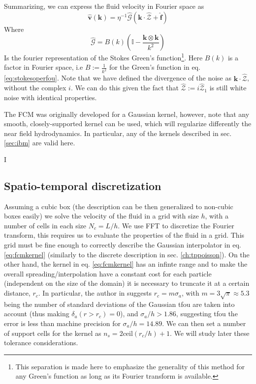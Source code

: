 \documentclass[ twoside,openright,titlepage,numbers=noenddot,%
headinclude,footinclude,cleardoublepage=empty,abstract=on,
BCOR=5mm,paper=a4,fontsize=11pt, dvipsnames
]{scrreprt}
\renewcommand{\vec}[1]{\bm{#1}}
\newcommand{\tens}[1]{\bm{\mathcal{#1}}}
\newcommand{\fou}[1]{\widehat{#1}}
\newcommand{\fvel}{v}
\begin{document}
Summarizing, we can express the fluid velocity in Fourier space as
\begin{equation}
  \label{eq:fcmvel}
  \fou{\vec{\fvel}}(\vec{k}) = \eta^{-1}\hat{\tens{G}}\left(\vec{k}\cdot\fou{\mathcal{Z}} + \fou{\vec{f}}\right)
\end{equation}
Where
\begin{equation}
  \fou{\tens{G}} = B(k)\left(\mathbb{I} - \frac{\vec{k}\otimes\vec{k}}{k^2}\right)
\end{equation}
Is the fourier representation of the Stokes Green's function\footnote{This separation is made here to emphasize the generality of this method for any Green's function as long as its Fourier transform is available.}.
Here $B(k)$ is a factor in Fourier space, i.e $B := \frac{1}{k^2}$ for the Green's function in eq. \eqref{eq:stokesoperfou}.
Note that we have defined the divergence of the noise as $\vec{k}\cdot\fou{\mathcal{Z}}$, without the complex $i$. We can do this given the fact that $\fou{\mathcal{Z}} := i\fou{\mathcal{Z}}_1$ is still white noise with identical properties.

The \gls{FCM} was originally developed for a Gaussian kernel, however, note that any smooth, closely-supported kernel can be used, which will regularize differently the near field hydrodynamics. In particular, any of the kernels described in sec. \ref{sec:ibm} are valid here.

I
\subsection*{Spatio-temporal discretization}
Assuming a cubic box (the description can be then generalized to non-cubic boxes easily) we solve the velocity of the fluid in a grid with size $h$, with a number of cells in each size $N_c = L/h$.
We use \gls{FFT} to discretize the Fourier transform, this requires us to evaluate the properties of the fluid in a grid. This grid must be fine enough to correctly describe the Gaussian interpolator in eq. \eqref{eq:fcmkernel} (similarly to the discrete description in sec. \ref{ch:tppoisson}). On the other hand, the kernel in eq. \eqref{eq:fcmkernel} has an infinte range and to make the overall spreading/interpolation have a constant cost for each particle (independent on the size of the domain) it is necessary to truncate it at a certain distance, $r_c$. In particular, the author in \cite{Keaveny2014} suggests $r_c=m \sigma_a$, with $m=3\sqrt{\pi}\approx 5.3$ being the number of standard deviations of the Gaussian tfou are taken into account (thus making $\delta_a(r>r_c) = 0$), and $\sigma_a/h > 1.86$, suggesting tfou the error is less than machine precision for $\sigma_a/h = 14.89$. We can then set a number of support cells for the kernel as $n_s = 2 \textrm{ceil}(r_c/h)+1$.
We will study later these tolerance considerations.
\end{document}
